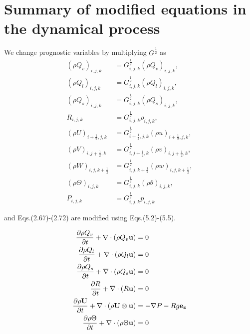 \section{Summary of modified equations in the dynamical process}

We change prognostic variables by multiplying $G^{\frac{1}{2}}$ as
\begin{align}
 (\rho Q_v)_{i,j,k}           &= G^{\frac{1}{2}}_{i,j,k}             (\rho Q_v)_{i,j,k},        \\
 (\rho Q_l)_{i,j,k}           &= G^{\frac{1}{2}}_{i,j,k}             (\rho Q_l)_{i,j,k},        \\
 (\rho Q_s)_{i,j,k}           &= G^{\frac{1}{2}}_{i,j,k}             (\rho Q_s)_{i,j,k},        \\
 R_{i,j,k}                    &= G^{\frac{1}{2}}_{i,j,k}              \rho_{i,j,k},                \\
 (\rho U)_{i+\frac{1}{2},j,k} &= G^{\frac{1}{2}}_{i+\frac{1}{2},j,k} (\rho u)_{i+\frac{1}{2},j,k}, \\
 (\rho V)_{i,j+\frac{1}{2},k} &= G^{\frac{1}{2}}_{i,j+\frac{1}{2},k} (\rho v)_{i,j+\frac{1}{2},k}, \\
 (\rho W)_{i,j,k+\frac{1}{2}} &= G^{\frac{1}{2}}_{i,j,k+\frac{1}{2}} (\rho w)_{i,j,k+\frac{1}{2}}, \\
 (\rho \Theta)_{i,j,k}        &= G^{\frac{1}{2}}_{i,j,k}             (\rho \theta)_{i,j,k},        \\
 P_{i,j,k}                    &= G^{\frac{1}{2}}_{i,j,k}              p_{i,j,k}
\end{align}

and Eqs.(2.67)-(2.72) are modified using Eqs.(5.2)-(5.5).

\begin{align}
 \frac{\partial \rho Q_v     }{\partial t} + \nabla \cdot \left( \rho Q_v             {\bf u}\right) &= 0 \\
 \frac{\partial \rho Q_l     }{\partial t} + \nabla \cdot \left( \rho Q_l             {\bf u}\right) &= 0 \\
 \frac{\partial \rho Q_s     }{\partial t} + \nabla \cdot \left( \rho Q_s             {\bf u}\right) &= 0 \\
 \frac{\partial R            }{\partial t} + \nabla \cdot \left( R                    {\bf u}\right) &= 0 \\
 \frac{\partial \rho {\bf U} }{\partial t} + \nabla \cdot \left( \rho {\bf U} \otimes {\bf u}\right) &= -\nabla P - Rg {\bf e_z} \\
 \frac{\partial \rho \Theta  }{\partial t} + \nabla \cdot \left( \rho \Theta          {\bf u}\right) &= 0
\end{align}


